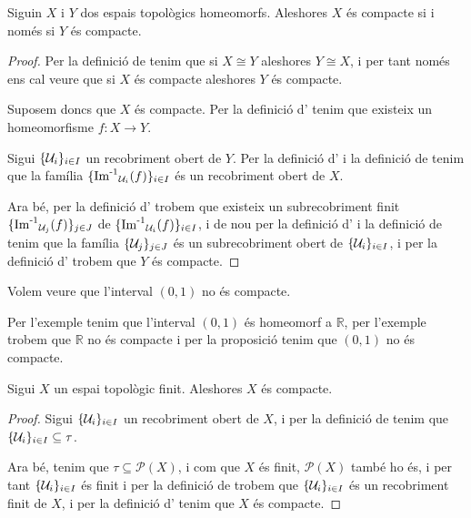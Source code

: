 \documentclass[../Apunts.tex]{subfiles}
\begin{document}
	\begin{proposition}
		\label{prop:la compacitat és una propietat topològica}
		Siguin \(X\) i \(Y\) dos espais topològics homeomorfs. Aleshores \(X\) és compacte si i només si \(Y\) és compacte.
		\begin{proof}
			Per la definició de  tenim que si \(X\cong Y\) aleshores \(Y\cong X\), i per tant només ens cal veure que si \(X\) és compacte aleshores \(Y\) és compacte.
			
			Suposem doncs que \(X\) és compacte. Per la definició d' tenim que existeix un homeomorfisme \(f\colon X\longrightarrow Y\).
			
			Sigui \(\{\mathcal{U}_{i}\}_{i\in I}\) un recobriment obert de \(Y\). Per la definició d' i la definició de  tenim que la família \(\{\operatorname{\operatorname{Im}^{-1}}_{\mathcal{U}_{i}}(f)\}_{i\in I}\) és un recobriment obert de \(X\).
			
			Ara bé, per la definició d' trobem que existeix un subrecobriment finit \(\{\operatorname{\operatorname{Im}^{-1}}_{\mathcal{U}_{j}}(f)\}_{j\in J}\) de \(\{\operatorname{\operatorname{Im}^{-1}}_{\mathcal{U}_{i}}(f)\}_{i\in I}\), i de nou per la definició d' i la definició de  tenim que la família \(\{\mathcal{U}_{j}\}_{j\in J}\) és un subrecobriment obert de \(\{\mathcal{U}_{i}\}_{i\in I}\), i per la definició d' trobem que \(Y\) és compacte.
		\end{proof}
	\end{proposition}
	\begin{example}
		\label{ex:l'interval (0,1) no és compacte}
		Volem veure que l'interval \((0,1)\) no és compacte.
		\begin{solution}
			Per l'exemple  tenim que l'interval \((0,1)\) és homeomorf a \(\mathbb{R}\), per l'exemple  trobem que \(\mathbb{R}\) no és compacte i per la proposició  tenim que \((0,1)\) no és compacte.
		\end{solution}
	\end{example}
	\begin{proposition}
		\label{prop:un espai topològic finit és compacte}
		Sigui \(X\) un espai topològic finit. Aleshores \(X\) és compacte.
		\begin{proof}
			Sigui \(\{\mathcal{U}_{i}\}_{i\in I}\) un recobriment obert de \(X\), i per la definició de  tenim que \(\{\mathcal{U}_{i}\}_{i\in I}\subseteq\tau\).
			
			Ara bé, tenim que \(\tau\subseteq\mathcal{P}(X)\), i com que \(X\) és finit, \(\mathcal{P}(X)\) també ho és, i per tant \(\{\mathcal{U}_{i}\}_{i\in I}\) és finit i per la definició de  trobem que \(\{\mathcal{U}_{i}\}_{i\in I}\) és un recobriment finit de \(X\), i per la definició d' tenim que \(X\) és compacte.
		\end{proof}
	\end{proposition}
\end{document}
